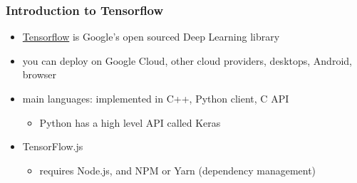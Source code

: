 \documentclass[xcolor=table]{beamer}
\begin{document}
\begin{mdframe}%

\frametitle{Introduction to Tensorflow}\label{heading-sec-introduction-to-tensorflow}%

\begin{itemize}%

\item{}
\href{https://www.tensorflow.org/}{Tensorflow} is Google's open sourced Deep Learning library%

\item{}
you can deploy on Google Cloud, other cloud providers, desktops, Android, browser%

\item{}
main languages: implemented in C++, Python client, C API%

\begin{itemize}[noitemsep,topsep=\mdcompacttopsep]%

\item{}Python has a high level API called Keras%
\end{itemize}%

\item{}
TensorFlow.js%

\begin{itemize}[noitemsep,topsep=\mdcompacttopsep]%

\item{}requires Node.js, and NPM or Yarn (dependency management)%
\end{itemize}%
\end{itemize}%
\end{mdframe}\label{sec-introduction-to-tensorflow}%
\end{document}
